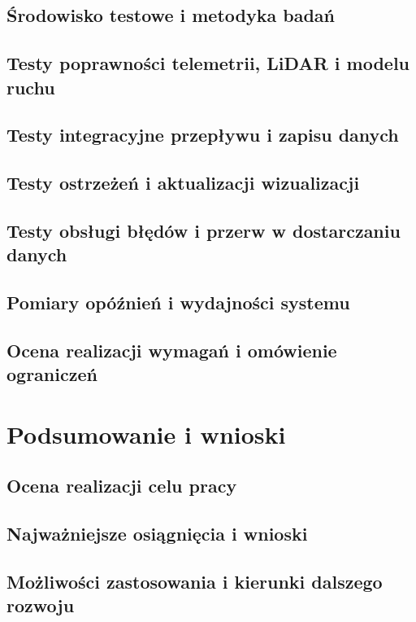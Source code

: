 \documentclass[11pt,a4paper]{report}
\begin{document}
\section{Środowisko testowe i metodyka badań}
\section{Testy poprawności telemetrii, LiDAR i modelu ruchu}
\section{Testy integracyjne przepływu i zapisu danych}
\section{Testy ostrzeżeń i aktualizacji wizualizacji}
\section{Testy obsługi błędów i przerw w dostarczaniu danych}
\section{Pomiary opóźnień i wydajności systemu}
\section{Ocena realizacji wymagań i omówienie ograniczeń}

\chapter{Podsumowanie i wnioski}
\section{Ocena realizacji celu pracy}
\section{Najważniejsze osiągnięcia i wnioski}
\section{Możliwości zastosowania i kierunki dalszego rozwoju}
\end{document}
